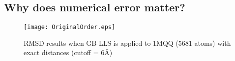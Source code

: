 \documentclass[a4paper,12pt]{article}
\begin{document}
\subsection{Why does numerical error matter?}
%
%
%

\begin{figure}[htbp!]
  \centering
  \texttt{[image: OriginalOrder.eps]}\\
  \caption{RMSD results when GB-LLS is applied to 1MQQ (5681 atoms) with exact distances (cutoff = 6\AA)}\label{fig:OriginalOrder}
\end{figure}
\end{document}
